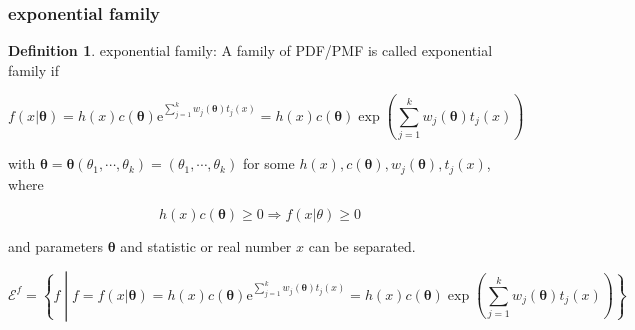 \documentclass[
]{book}
\theoremstyle{definition}
\newtheorem{definition}{Definition}[chapter]
\theoremstyle{definition}
\theoremstyle{definition}
\theoremstyle{definition}
\theoremstyle{remark}
\begin{document}
\subsubsection{exponential family}\label{exponential-family}

\begin{definition}
\protect\hypertarget{def:unnamed-chunk-33}{}\label{def:unnamed-chunk-33}exponential family: A family of PDF/PMF is called exponential family if
\end{definition}

\[
f\left(x|\boldsymbol{\theta}\right)=h\left(x\right)c\left(\boldsymbol{\theta}\right)\mathrm{e}^{{\scriptscriptstyle \sum\limits _{j=1}^{k}w_{{\scriptscriptstyle j}}\left(\boldsymbol{\theta}\right)t_{{\scriptscriptstyle j}}\left(x\right)}}=h\left(x\right)c\left(\boldsymbol{\theta}\right)\exp\left(\sum\limits _{j=1}^{k}w_{{\scriptscriptstyle j}}\left(\boldsymbol{\theta}\right)t_{{\scriptscriptstyle j}}\left(x\right)\right)
\]

with \(\boldsymbol{\theta}=\boldsymbol{\theta}\left(\theta_{{\scriptscriptstyle 1}},\cdots,\theta_{{\scriptscriptstyle k}}\right)=\left(\theta_{{\scriptscriptstyle 1}},\cdots,\theta_{{\scriptscriptstyle k}}\right)\) for some \(h\left(x\right),c\left(\boldsymbol{\theta}\right),w_{{\scriptscriptstyle j}}\left(\boldsymbol{\theta}\right),t_{{\scriptscriptstyle j}}\left(x\right)\), where

\[
h\left(x\right)c\left(\boldsymbol{\theta}\right)\ge0\Rightarrow f\left(x|\theta\right)\ge0
\]

and parameters \(\boldsymbol{\theta}\) and statistic or real number \(x\) can be separated.

\[
\mathcal{E}^{f}=\left\{ f\middle|f=f\left(x|\boldsymbol{\theta}\right)=h\left(x\right)c\left(\boldsymbol{\theta}\right)\mathrm{e}^{{\scriptscriptstyle \sum\limits _{j=1}^{k}w_{{\scriptscriptstyle j}}\left(\boldsymbol{\theta}\right)t_{{\scriptscriptstyle j}}\left(x\right)}}=h\left(x\right)c\left(\boldsymbol{\theta}\right)\exp\left(\sum\limits _{j=1}^{k}w_{{\scriptscriptstyle j}}\left(\boldsymbol{\theta}\right)t_{{\scriptscriptstyle j}}\left(x\right)\right)\right\} 
\]
\end{document}
